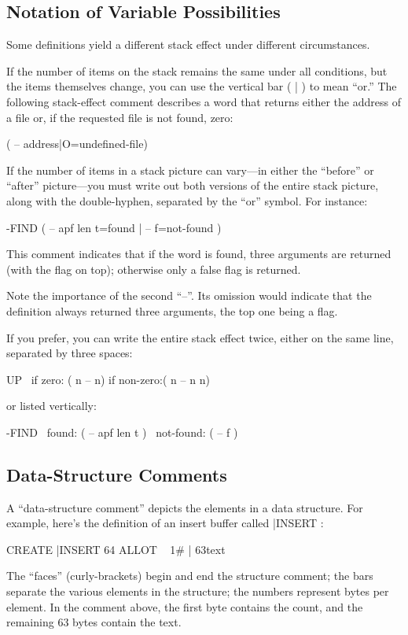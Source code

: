 \subsection{Notation of Variable Possibilities}
Some definitions yield a different stack effect under different circumstances.

If the number of items on the stack remains the same under all conditions,
but the items themselves change, you can use the vertical bar ( | )
to mean ``or.'' The following stack-effect comment describes a word that
returns either the address of a file or, if the requested file is not found,
zero:
\begin{Code}
( -- address|O=undefined-file)
\end{Code}
If the number of items in a stack picture can vary---in either the ``before''
or ``after'' picture---you must write out both versions of the entire stack
picture, along with the double-hyphen, separated by the ``or'' symbol.  For
instance:
\begin{Code}
-FIND ( -- apf len t=found | -- f=not-found )
\end{Code}
This comment indicates that if the word is found, three arguments are
returned (with the flag on top); otherwise only a false flag is returned.

Note the importance of the second ``--''.  Its omission would indicate
that the definition always returned three arguments, the top one being a
flag.

If you prefer, you can write the entire stack effect twice, either on
the same line, separated by three spaces:
\begin{Code}
  UP \ if zero: ( n -- n)    if non-zero:( n -- n n)
\end{Code}
or listed vertically:
\begin{Code}
-FIND  \     found: ( -- apf len t )
       \ not-found: ( -- f )
\end{Code}
\subsection{Data-Structure Comments}

A ``data-structure comment'' depicts the elements in a data structure.
For example, here's the definition of an insert buffer called |INSERT :
\begin{Code}
CREATE |INSERT  64 ALLOT  \  { 1# | 63text }
\end{Code}
The ``faces'' (curly-brackets) begin and end the structure comment; the
bars separate the various elements in the structure; the numbers represent
bytes per element.  In the comment above, the first byte contains the
count, and the remaining 63 bytes contain the text.

